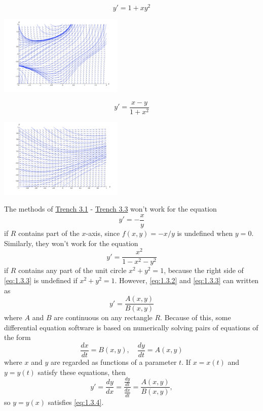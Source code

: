 \documentclass{ximera}
\begin{document}
\begin{example}\label{ex:fig010303}
$$
y'=1+xy^2
$$
\begin{image}
  \includegraphics[height=1.5in]{fig010303.jpg}
\end{image}
\end{example}
\begin{example}\label{ex:fig010304}
$$
y'=\frac{x-y}{1+x^2}
$$
\begin{image}
   \includegraphics[height=1.5in]{fig010304.jpg}
\end{image}
\end{example}
The methods of \href{https://ximera.osu.edu/ode/main/eulersMethod/eulersMethod}{Trench 3.1} - \href{https://ximera.osu.edu/ode/main/rungeKutta/rungeKutta}{Trench 3.3} won't work for the equation
\begin{equation} \label{eq:1.3.2}
y'=-\frac{x}{y}
\end{equation}
if $R$ contains part of the $x$-axis, since $f(x,y)=-x/y$ is undefined
when $y=0$. Similarly, they won't work for the equation
\begin{equation} \label{eq:1.3.3}
y'=\frac{x^2}{1-x^2-y^2}
\end{equation}
if $R$ contains any part of the unit circle $x^2+y^2=1$, because the
right side of \eqref{eq:1.3.3} is undefined if $x^2+y^2=1$. However,
\eqref{eq:1.3.2} and \eqref{eq:1.3.3} can written as
\begin{equation} \label{eq:1.3.4}
y'=\frac{A(x,y)}{B(x,y)}
\end{equation}
where $A$ and $B$ are  continuous on any rectangle $R$. Because of
this,
some differential equation software is based on
numerically solving pairs of equations of the form
\begin{equation} \label{eq:1.3.5}
\frac{dx}{dt}=B(x,y),\quad \frac{dy}{dt}=A(x,y)
\end{equation}
where $x$ and $y$ are regarded as functions of a parameter $t$.
If $x=x(t)$ and $y=y(t)$  satisfy these equations, then
$$
y'=\frac{dy}{dx}=\frac{\frac{dy}{dt}}{\frac{dx}{dt}}=\frac{A(x,y)}{B(x,y)},
$$
so $y=y(x)$ satisfies \eqref{eq:1.3.4}.
 
\end{document}
